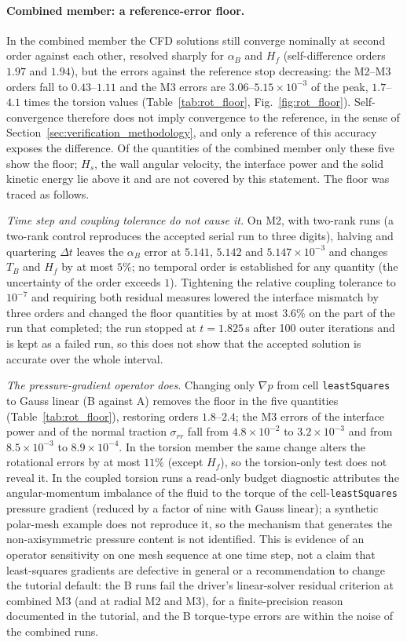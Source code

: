 \paragraph{Combined member: a reference-error floor.}
In the combined member the CFD solutions still converge nominally at second order against each other, resolved sharply for $\alpha_B$ and $H_f$ (self-difference orders $1.97$ and $1.94$), but the errors against the reference stop decreasing: the M2--M3 orders fall to $0.43$--$1.11$ and the M3 errors are $3.06$--$5.15\times10^{-3}$ of the peak, $1.7$--$4.1$ times the torsion values (Table~\ref{tab:rot_floor}, Fig.~\ref{fig:rot_floor}).
Self-convergence therefore does not imply convergence to the reference, in the sense of Section~\ref{sec:verification_methodology}, and only a reference of this accuracy exposes the difference.
Of the quantities of the combined member only these five show the floor; $H_s$, the wall angular velocity, the interface power and the solid kinetic energy lie above it and are not covered by this statement.
The floor was traced as follows.

\emph{Time step and coupling tolerance do not cause it.}
On M2, with two-rank runs (a two-rank control reproduces the accepted serial run to three digits), halving and quartering $\Delta t$ leaves the $\alpha_B$ error at $5.141$, $5.142$ and $5.147\times10^{-3}$ and changes $T_B$ and $H_f$ by at most $5\%$; no temporal order is established for any quantity (the uncertainty of the order exceeds $1$).
Tightening the relative coupling tolerance to $10^{-7}$ and requiring both residual measures lowered the interface mismatch by three orders and changed the floor quantities by at most $3.6\%$ on the part of the run that completed; the run stopped at $t=1.825\,\mathrm{s}$ after 100 outer iterations and is kept as a failed run, so this does not show that the accepted solution is accurate over the whole interval.

\emph{The pressure-gradient operator does.}
Changing only $\nabla p$ from cell \texttt{leastSquares} to Gauss linear (B against A) removes the floor in the five quantities (Table~\ref{tab:rot_floor}), restoring orders $1.8$--$2.4$; the M3 errors of the interface power and of the normal traction $\sigma_{rr}$ fall from $4.8\times10^{-2}$ to $3.2\times10^{-3}$ and from $8.5\times10^{-3}$ to $8.9\times10^{-4}$.
In the torsion member the same change alters the rotational errors by at most $11\%$ (except $H_f$), so the torsion-only test does not reveal it.
In the coupled torsion runs a read-only budget diagnostic attributes the angular-momentum imbalance of the fluid to the torque of the cell-\texttt{leastSquares} pressure gradient (reduced by a factor of nine with Gauss linear); a synthetic polar-mesh example does not reproduce it, so the mechanism that generates the non-axisymmetric pressure content is not identified.
This is evidence of an operator sensitivity on one mesh sequence at one time step, not a claim that least-squares gradients are defective in general or a recommendation to change the tutorial default: the B runs fail the driver's linear-solver residual criterion at combined M3 (and at radial M2 and M3), for a finite-precision reason documented in the tutorial, and the B torque-type errors are within the noise of the combined runs.

